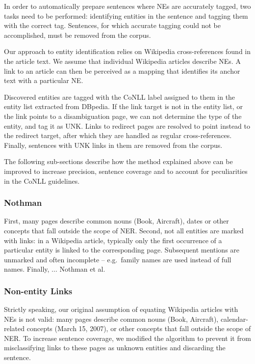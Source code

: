 \documentclass[11pt]{article}
\begin{document}
In order to automatically prepare sentences where NEs are accurately tagged, two tasks need to be performed: identifying entities in the sentence and tagging them with the correct tag. Sentences, for which accurate tagging could not be accomplished, must be removed from the corpus.

Our approach to entity identification relies on Wikipedia cross-references found in the article text. We assume that individual Wikipedia articles describe NEs. A link to an article can then be perceived as a mapping that identifies its anchor text with a particular NE.

Discovered entities are tagged with the CoNLL label assigned to them in the entity list extracted from DBpedia. If the link target is not in the entity list, or the link points to a disambiguation page, we can not determine the type of the entity, and tag it as UNK. Links to redirect pages are resolved to point instead to the redirect target, after which they are handled as regular cross-references. Finally, sentences with UNK links in them are removed from the corpus.

The following sub-sections describe how the method explained above can be improved to increase precision, sentence coverage and to account for peculiarities in the CoNLL guidelines.

\subsubsection{Nothman}

First, many pages describe common nouns (Book, Aircraft), dates or other concepts that fall outside the scope of NER. Second, not all entities are marked with links: in a Wikipedia article, typically only the first occurrence of a particular entity is linked to the corresponding page. Subsequent mentions are unmarked and often incomplete -- e.g.~family names are used instead of full names. Finally, 
...
Nothman et al.~ 

\subsubsection{Non-entity Links}

Strictly speaking, our original assumption of equating Wikipedia articles with NEs is not valid: many pages describe common nouns (Book, Aircraft), calendar-related concepts (March 15, 2007), or other concepts that fall outside the scope of NER. To increase sentence coverage, we modified the algorithm to prevent it from misclassifying links to these pages as unknown entities and discarding the sentence.
\end{document}
